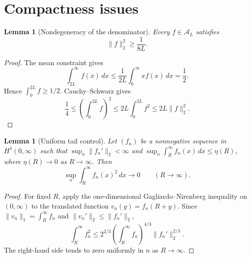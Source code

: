 \documentclass[11pt]{amsart}
\newtheorem{lemma}[theorem]{Lemma}
\theoremstyle{definition}
\theoremstyle{remark}
\newcommand{\A}{\mathcal A}
\begin{document}
\section{Compactness issues}
\begin{lemma}[Nondegeneracy of the denominator]\label{lem:l2}
Every $f\in\A_L$ satisfies
\[
 \|f\|_2^2\geq\frac{1}{8L}.
\]
\end{lemma}
\begin{proof}
The mean constraint gives
\[
 \int_{2L}^\infty f(x)\,dx\leq\frac{1}{2L}\int_0^\infty xf(x)\,dx=\frac12.
\]
Hence $\int_0^{2L}f\geq1/2$. Cauchy--Schwarz gives
\[
 \frac14\leq\left(\int_0^{2L}f\right)^2
 \leq2L\int_0^{2L}f^2
 \leq2L\|f\|_2^2.
\]
\end{proof}

\begin{lemma}[Uniform tail control]\label{lem:tail}
Let $(f_n)$ be a nonnegative sequence in $H^1(0,\infty)$ such that
$\sup_n\|f_n'\|_2<\infty$ and
$\sup_n\int_R^\infty f_n(x)\,dx\leq\eta(R)$, where $\eta(R)\to0$ as
$R\to\infty$. Then
\[
 \sup_n\int_R^\infty f_n(x)^2\,dx\longrightarrow0
 \qquad(R\to\infty).
\]
\end{lemma}
\begin{proof}
For fixed $R$, apply the one-dimensional Gagliardo--Nirenberg inequality on
$(0,\infty)$ to the translated function $v_n(y)=f_n(R+y)$. Since
$\|v_n\|_1=\int_R^\infty f_n$ and $\|v_n'\|_2\leq\|f_n'\|_2$,
\[
 \int_R^\infty f_n^2
 \leq 2^{2/3}\left(\int_R^\infty f_n\right)^{4/3}
 \|f_n'\|_2^{2/3}.
\]
The right-hand side tends to zero uniformly in $n$ as $R\to\infty$.
\end{proof}
\end{document}
